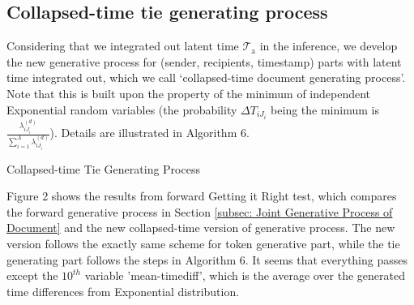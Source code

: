 \documentclass[a4paper]{article}
\begin{document}
   \subsection{Collapsed-time tie generating process} \label{subsubsec: collapsed time Generative Process}
   Considering that we integrated out latent time $\mathcal{T}_{\mbox{a}}$ in the inference, we develop the new generative process for (sender, recipients, timestamp) parts with latent time integrated out, which we call `collapsed-time document generating process'. Note that this is built upon the property of the minimum of independent Exponential random variables (the probability $\Delta T_{i{J_i}}$ being the minimum is $\frac{\lambda_{i{J_i}}^{(d)}}{\sum_{i=1}^A\lambda_{i{J_i}}^{(d)}}$). Details are illustrated in Algorithm 6.
   \begin{algorithm}[H]
   	\SetAlgoLined
   	\caption{Collapsed-time Tie Generating Process}
   \end{algorithm}
   \noindent Figure 2 shows the results from forward Getting it Right test, which compares the forward generative process in Section \ref{subsec: Joint Generative Process of Document} and the new collapsed-time version of generative process.  The new version follows the exactly same scheme for token generative part, while the tie generating part follows the steps in Algorithm 6. It seems that everything passes except the $10^{th}$ variable 'mean-timediff', which is the average over the generated time differences from Exponential distribution.
\end{document}
